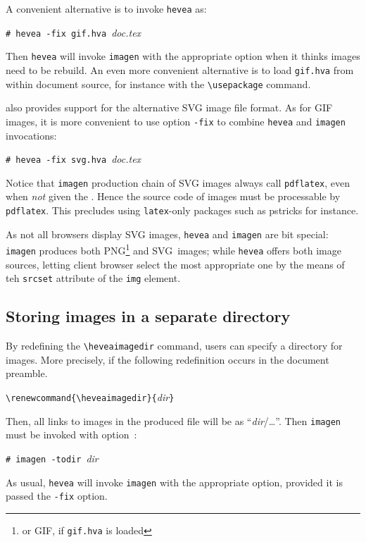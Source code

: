 A convenient alternative is to invoke \texttt{hevea} as:
\begin{flushleft}
\texttt{\#~hevea~-fix~gif.hva}~\textit{doc.tex}
\end{flushleft}
Then \texttt{hevea} will invoke \texttt{imagen} with the appropriate
option when it thinks images need to be rebuild.
An even more convenient alternative is to load \texttt{gif.hva}
from within document source, for instance with the \verb+\usepackage+
command.

\hevea{} also  provides support for the alternative SVG image file format.
As for GIF images, it is more convenient to use option \texttt{-fix}
to combine \texttt{hevea} and \texttt{imagen} invocations:
\begin{flushleft}
\texttt{\#~hevea~-fix~svg.hva}~\textit{doc.tex}
\end{flushleft}
Notice that \texttt{imagen} production chain of SVG images always
call \texttt{pdflatex}, even when \emph{not} given
the .
Hence the source code of images must be processable
by \texttt{pdflatex}. This precludes using \texttt{latex}-only packages
such as pstricks for instance.

As not all browsers display SVG images, \texttt{hevea} and
\texttt{imagen} are  bit special:
\texttt{imagen} produces both PNG\footnote{or GIF, if \texttt{gif.hva} is loaded} and SVG~images; while \texttt{hevea} offers both image sources,
letting client browser select the most appropriate one by the means of
teh \verb+srcset+ attribute of the \verb+img+ element.

\subsection{Storing images in a separate directory} 
By redefining the \verb+\heveaimagedir+ command, users can specify a
directory for images.
More precisely, if the following redefinition occurs in the document
preamble.
\begin{flushleft}
\verb+\renewcommand{\heveaimagedir}{+\textit{dir}\verb+}+
\end{flushleft}
Then, all links to images in the produced \html{} file will be as
``\textit{dir}/\ldots''.
Then \texttt{imagen} must be invoked with option~:
\begin{flushleft}
\texttt{\#~imagen~-todir}~\textit{dir}~
\end{flushleft}
As usual, \texttt{hevea} will invoke \texttt{imagen} with the
appropriate option, provided it is passed the \texttt{-fix} option.


